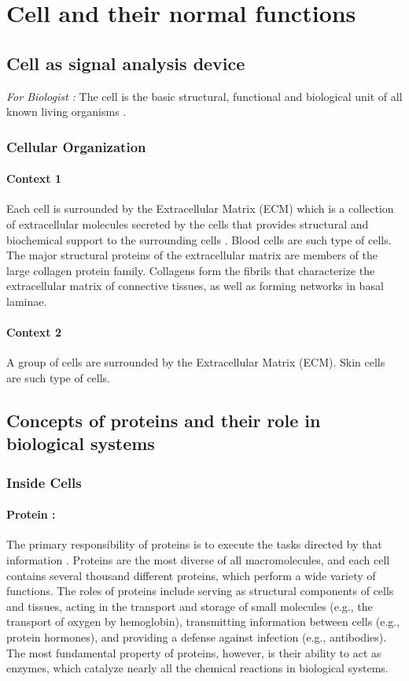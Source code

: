 \documentclass[11pt]{report}
\begin{document}
\chapter{Cell and their normal functions}
\section{\color{red}Cell as signal analysis device}
\emph{For Biologist :} The cell is the basic structural, functional and biological unit of all known living organisms \cite{wiki:cell}.
\subsection{\color{blue}Cellular Organization}
\subsubsection{Context 1}
Each cell is surrounded by the Extracellular Matrix (ECM) which is a collection of extracellular molecules secreted by the cells that provides structural and biochemical support to the surrounding cells \cite{wiki:ecm}.
Blood cells are such type of cells.
The major structural proteins of the extracellular matrix are members of the large collagen protein family. Collagens form the fibrils that characterize the extracellular matrix of connective tissues, as well as forming networks in basal laminae.

\subsubsection{Context 2}
A group of cells are surrounded by the Extracellular Matrix (ECM).
Skin cells are such type of cells.

\section{\color{red}Concepts of proteins and their role in biological systems}
\subsection{\color{blue}Inside Cells}
\subsubsection{Protein :}
The primary responsibility of proteins is to execute the tasks directed by that information \cite{cooper2007cell}.
Proteins are the most diverse of all macromolecules, and each cell contains several thousand different proteins, which perform a wide variety of functions.
The roles of proteins include serving as structural components of cells and tissues, acting in the transport and storage of small molecules (e.g., the transport of oxygen by hemoglobin), transmitting information between cells (e.g., protein hormones), and providing a defense against infection (e.g., antibodies).
The most fundamental property of proteins, however, is their ability to act as enzymes, which catalyze nearly all the chemical reactions in biological systems.
\end{document}
